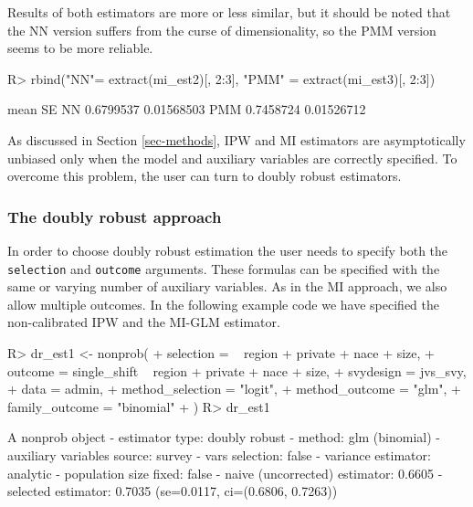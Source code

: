 \documentclass[
]{jss}
\begin{document}
Results of both estimators are more or less similar, but it should be
noted that the NN version suffers from the curse of dimensionality, so
the PMM version seems to be more reliable.

\begin{CodeChunk}
\begin{CodeInput}
R> rbind("NN"= extract(mi_est2)[, 2:3], "PMM" = extract(mi_est3)[, 2:3])
\end{CodeInput}
\begin{CodeOutput}
         mean         SE
NN  0.6799537 0.01568503
PMM 0.7458724 0.01526712
\end{CodeOutput}
\end{CodeChunk}

As discussed in Section \ref{sec-methods}, IPW and MI estimators are
asymptotically unbiased only when the model and auxiliary variables are
correctly specified. To overcome this problem, the user can turn to
doubly robust estimators.

\subsubsection{The doubly robust
approach}\label{the-doubly-robust-approach}

In order to choose doubly robust estimation the user needs to specify
both the \texttt{selection} and \texttt{outcome} arguments. These
formulas can be specified with the same or varying number of auxiliary
variables. As in the MI approach, we also allow multiple outcomes. In
the following example code we have specified the non-calibrated IPW and
the MI-GLM estimator.

\begin{CodeChunk}
\begin{CodeInput}
R> dr_est1 <- nonprob(
+   selection = ~ region + private + nace + size,
+   outcome = single_shift ~ region + private + nace + size,
+   svydesign = jvs_svy,
+   data = admin,
+   method_selection = "logit",
+   method_outcome = "glm",
+   family_outcome = "binomial"
+ )
R> dr_est1
\end{CodeInput}
\begin{CodeOutput}
A nonprob object
 - estimator type: doubly robust
 - method: glm (binomial)
 - auxiliary variables source: survey
 - vars selection: false
 - variance estimator: analytic
 - population size fixed: false
 - naive (uncorrected) estimator: 0.6605
 - selected estimator: 0.7035 (se=0.0117, ci=(0.6806, 0.7263))
\end{CodeOutput}
\end{CodeChunk}
\end{document}

